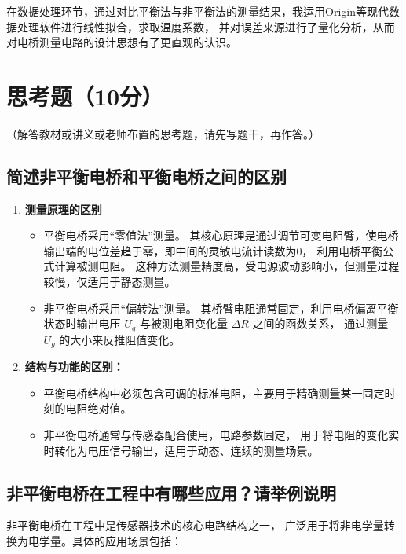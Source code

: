 \documentclass{../template/Report}%
\begin{document}
\begin{fullreportonly}
    在数据处理环节，通过对比平衡法与非平衡法的测量结果，我运用Origin等现代数据处理软件进行线性拟合，求取温度系数，
    并对误差来源进行了量化分析，从而对电桥测量电路的设计思想有了更直观的认识。

    \section{思考题（10分）}
    （解答教材或讲义或老师布置的思考题，请先写题干，再作答。）
    \subsection{简述非平衡电桥和平衡电桥之间的区别}
    \begin{enumerate}
        \item \textbf{测量原理的区别}
              \begin{itemize}
                  \item 平衡电桥采用“零值法”测量。
                        其核心原理是通过调节可变电阻臂，使电桥输出端的电位差趋于零，即中间的灵敏电流计读数为0，
                        利用电桥平衡公式计算被测电阻。
                        这种方法测量精度高，受电源波动影响小，但测量过程较慢，仅适用于静态测量。
                  \item 非平衡电桥采用“偏转法”测量。
                        其桥臂电阻通常固定，利用电桥偏离平衡状态时输出电压 $U_g$ 与被测电阻变化量 $\Delta R$ 之间的函数关系，
                        通过测量 $U_g$ 的大小来反推阻值变化。
              \end{itemize}
        \item \textbf{结构与功能的区别：}
              \begin{itemize}
                  \item 平衡电桥结构中必须包含可调的标准电阻，主要用于精确测量某一固定时刻的电阻绝对值。
                  \item 非平衡电桥通常与传感器配合使用，电路参数固定，
                        用于将电阻的变化实时转化为电压信号输出，适用于动态、连续的测量场景。
              \end{itemize}
    \end{enumerate}

    \subsection{非平衡电桥在工程中有哪些应用？请举例说明}
    非平衡电桥在工程中是传感器技术的核心电路结构之一，
    广泛用于将非电学量转换为电学量。具体的应用场景包括：


\end{fullreportonly}
\end{document}
